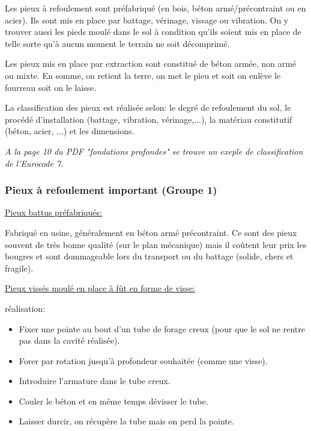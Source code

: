         Les pieux à refoulement sont préfabriqué (en bois, béton armé/précontraint ou en acier). Ils sont mis en place par battage, vérinage, vissage ou vibration. On y trouver aussi les pieds moulé dans le sol à condition qu'ils soient mis en place de telle sorte qu'à aucun moment le terrain ne soit décomprimé.
        
        Les pieux mis en place par extraction sont constitué de béton armée, non armé ou mixte. En somme, on retient la terre, on met le pieu et soit on enlève le fourreau soit on le laisse.
        
        La classification des pieux est réalisée selon: le degré de refoulement du sol, le procédé d'installation (battage, vibration, vérinage,...), la matériau constitutif (béton, acier, ...) et les dimensions.
        
        \textit{A la page 10 du PDF "fondations profondes" se trouve un exeple de classification de l'Eurocode 7.}
        
        \subsubsection{Pieux à refoulement important (Groupe 1)}
        
        \underline{Pieux battus préfabriqués:} 
        
        Fabriqué en usine, généralement en béton armé précontraint. Ce sont des pieux souvent de très bonne qualité (sur le plan mécanique) mais il coûtent leur prix les bougres et sont dommageable lors du transport ou du battage (solide, chers et fragile). 
        
        \underline{Pieux vissés moulé en place à fût en forme de visse:}
        
        réalisation:
        \begin{itemize}
            \item Fixer une pointe au bout d'un tube de forage creux (pour que le sol ne rentre pas dans la cavité réalisée).
            \item Forer par rotation jusqu'à profondeur souhaitée (comme une visse).
            \item Introduire l'armature dans le tube creux.
            \item Couler le béton et en même temps dévisser le tube.
            \item Laisser durcir, on récupère la tube mais on perd la pointe.
        \end{itemize} 
                

